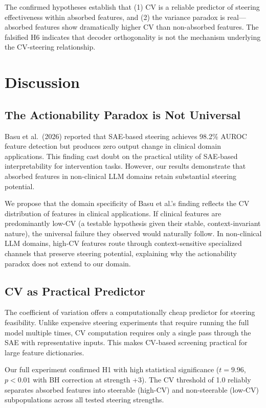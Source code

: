 \documentclass{article}
\begin{document}
The confirmed hypotheses establish that (1) CV is a reliable predictor of steering effectiveness within absorbed features, and (2) the variance paradox is real---absorbed features show dramatically higher CV than non-absorbed features. The falsified H6 indicates that decoder orthogonality is not the mechanism underlying the CV-steering relationship.

\section{Discussion}

\subsection{The Actionability Paradox is Not Universal}

Basu et al.\ (2026) reported that SAE-based steering achieves 98.2\% AUROC feature detection but produces zero output change in clinical domain applications. This finding cast doubt on the practical utility of SAE-based interpretability for intervention tasks. However, our results demonstrate that absorbed features in non-clinical LLM domains retain substantial steering potential.

We propose that the domain specificity of Basu et al.'s finding reflects the CV distribution of features in clinical applications. If clinical features are predominantly low-CV (a testable hypothesis given their stable, context-invariant nature), the universal failure they observed would naturally follow. In non-clinical LLM domains, high-CV features route through context-sensitive specialized channels that preserve steering potential, explaining why the actionability paradox does not extend to our domain.

\subsection{CV as Practical Predictor}

The coefficient of variation offers a computationally cheap predictor for steering feasibility. Unlike expensive steering experiments that require running the full model multiple times, CV computation requires only a single pass through the SAE with representative inputs. This makes CV-based screening practical for large feature dictionaries.

Our full experiment confirmed H1 with high statistical significance ($t = 9.96$, $p < 0.01$ with BH correction at strength +3). The CV threshold of 1.0 reliably separates absorbed features into steerable (high-CV) and non-steerable (low-CV) subpopulations across all tested steering strengths.
\end{document}
